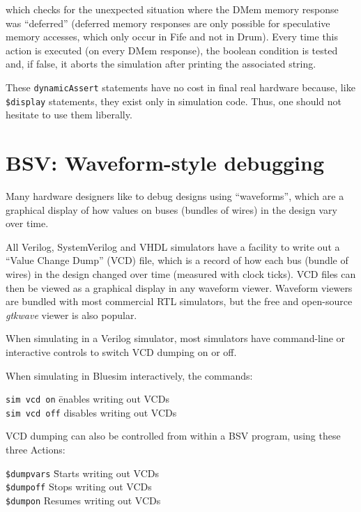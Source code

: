 which checks for the unexpected situation where the DMem memory
response was ``deferred'' (deferred memory responses are only possible
for speculative memory accesses, which only occur in Fife and not in
Drum).  Every time this action is executed (on every DMem response),
the boolean condition is tested and, if false, it aborts the
simulation after printing the associated string.

These \verb|dynamicAssert| statements have no cost in final real
hardware because, like \verb|$display| statements, they exist only in
simulation code.  Thus, one should not hesitate to use them liberally.


\section{BSV: Waveform-style debugging}


Many hardware designers like to debug designs using ``waveforms'',
which are a graphical display of how values on buses (bundles of
wires) in the design vary over time.

All Verilog, SystemVerilog and VHDL simulators have a facility to
write out a ``Value Change Dump'' (VCD) file, which is a record of how
each bus (bundle of wires) in the design changed over time (measured
with clock ticks).  VCD files can then be viewed as a graphical
display in any waveform viewer.  Waveform viewers are bundled with
most commercial RTL simulators, but the free and open-source
\emph{gtkwave} viewer is also popular.

When simulating in a Verilog simulator, most simulators have
command-line or interactive controls to switch VCD dumping on or off.

When simulating in Bluesim interactively, the commands:

\begin{tabbing}
\hmmmm \= {\tt sim vcd on}  \hmm \= enables writing out VCDs \\
       \> {\tt sim vcd off}      \> disables  writing out VCDs
\end{tabbing}

VCD dumping can also be controlled from within a BSV program, using
these three Actions:

\begin{tabbing}
\hmmmm \= {\tt \$dumpvars} \hmm \= Starts writing out VCDs \\
       \> {\tt \$dumpoff}       \> Stops  writing out VCDs \\
       \> {\tt \$dumpon}        \> Resumes writing out VCDs
\end{tabbing}

